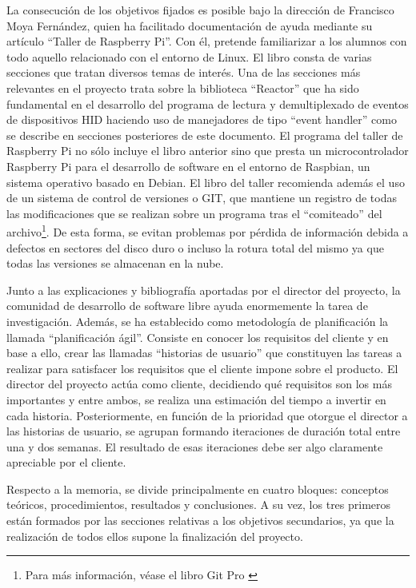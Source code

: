 La consecución de los objetivos fijados es posible bajo la dirección de Francisco Moya Fernández, quien ha facilitado documentación de ayuda mediante su artículo ``Taller de Raspberry Pi''. Con él, pretende familiarizar a los alumnos con todo aquello relacionado con el entorno de Linux. El libro consta de varias secciones que tratan diversos temas de interés. Una de las secciones más relevantes en el proyecto trata sobre la biblioteca ``Reactor'' que ha sido fundamental en el desarrollo del programa de lectura y demultiplexado de eventos de dispositivos HID haciendo uso de manejadores de tipo ``event handler'' como se describe en secciones posteriores de este documento. El programa del taller de Raspberry Pi no sólo incluye el libro anterior sino que presta un microcontrolador Raspberry Pi para el desarrollo de software en el entorno de Raspbian, un sistema operativo basado en Debian. El libro del taller recomienda además el uso de un sistema de control de versiones o GIT, que mantiene un registro de todas las modificaciones que se realizan sobre un programa tras el ``comiteado'' del archivo\footnote{Para más información, véase el libro Git Pro \citep{GIT}}. De esta forma, se evitan problemas por pérdida de información debida a defectos en sectores del disco duro o incluso la rotura total del mismo ya que todas las versiones se almacenan en la nube.

Junto a las explicaciones y bibliografía aportadas por el director del proyecto, la comunidad de desarrollo de software libre ayuda enormemente la tarea de investigación. Además, se ha establecido como metodología de planificación la llamada ``planificación ágil''. Consiste en conocer los requisitos del cliente y en base a ello, crear las llamadas ``historias de usuario'' que constituyen las tareas a realizar para satisfacer los requisitos que el cliente impone sobre el producto. El director del proyecto actúa como cliente, decidiendo qué requisitos son los más importantes y entre ambos, se realiza una estimación del tiempo a invertir en cada historia. Posteriormente, en función de la prioridad que otorgue el director a las historias de usuario, se agrupan formando iteraciones de duración total entre una y dos semanas. El resultado de esas iteraciones debe ser algo claramente apreciable por el cliente.

Respecto a la memoria, se divide principalmente en cuatro bloques: conceptos teóricos, procedimientos, resultados y conclusiones. A su vez, los tres primeros están formados por las secciones relativas a los objetivos secundarios, ya que la realización de todos ellos supone la finalización del proyecto.

